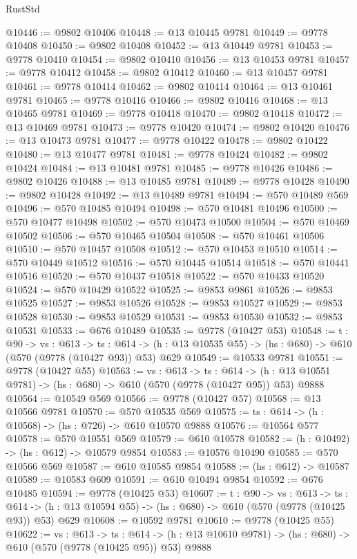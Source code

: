 \begin{lexlean}{RustStd}
\begin{coremodule}
@10446 := @9802 @10406
@10448 := @13 @10445 @9781
@10449 := @9778 @10408
@10450 := @9802 @10408
@10452 := @13 @10449 @9781
@10453 := @9778 @10410
@10454 := @9802 @10410
@10456 := @13 @10453 @9781
@10457 := @9778 @10412
@10458 := @9802 @10412
@10460 := @13 @10457 @9781
@10461 := @9778 @10414
@10462 := @9802 @10414
@10464 := @13 @10461 @9781
@10465 := @9778 @10416
@10466 := @9802 @10416
@10468 := @13 @10465 @9781
@10469 := @9778 @10418
@10470 := @9802 @10418
@10472 := @13 @10469 @9781
@10473 := @9778 @10420
@10474 := @9802 @10420
@10476 := @13 @10473 @9781
@10477 := @9778 @10422
@10478 := @9802 @10422
@10480 := @13 @10477 @9781
@10481 := @9778 @10424
@10482 := @9802 @10424
@10484 := @13 @10481 @9781
@10485 := @9778 @10426
@10486 := @9802 @10426
@10488 := @13 @10485 @9781
@10489 := @9778 @10428
@10490 := @9802 @10428
@10492 := @13 @10489 @9781
@10494 := @570 @10489 @569
@10496 := @570 @10485 @10494
@10498 := @570 @10481 @10496
@10500 := @570 @10477 @10498
@10502 := @570 @10473 @10500
@10504 := @570 @10469 @10502
@10506 := @570 @10465 @10504
@10508 := @570 @10461 @10506
@10510 := @570 @10457 @10508
@10512 := @570 @10453 @10510
@10514 := @570 @10449 @10512
@10516 := @570 @10445 @10514
@10518 := @570 @10441 @10516
@10520 := @570 @10437 @10518
@10522 := @570 @10433 @10520
@10524 := @570 @10429 @10522
@10525 := @9853 @9861
@10526 := @9853 @10525
@10527 := @9853 @10526
@10528 := @9853 @10527
@10529 := @9853 @10528
@10530 := @9853 @10529
@10531 := @9853 @10530
@10532 := @9853 @10531
@10533 := @676 @10489
@10535 := @9778 (@10427 @53)
@10548 := {t : @90} ->
  {vs : @613} ->
  {ts : @614} -> (h : @13 @10535 @55) -> (hs : @680) -> @610 (@570 (@9778 (@10427 @93)) @53) @629
@10549 := @10533 @9781
@10551 := @9778 (@10427 @55)
@10563 := {vs : @613} ->
  {ts : @614} -> (h : @13 @10551 @9781) -> (hs : @680) -> @610 (@570 (@9778 (@10427 @95)) @53) @9888
@10564 := @10549 @569
@10566 := @9778 (@10427 @57)
@10568 := @13 @10566 @9781
@10570 := @570 @10535 @569
@10575 := {ts : @614} -> (h : @10568) -> (hs : @726) -> @610 @10570 @9888
@10576 := @10564 @577
@10578 := @570 @10551 @569
@10579 := @610 @10578
@10582 := (h : @10492) -> (hs : @612) -> @10579 @9854
@10583 := @10576 @10490
@10585 := @570 @10566 @569
@10587 := @610 @10585 @9854
@10588 := (hs : @612) -> @10587
@10589 := @10583 @609
@10591 := @610 @10494 @9854
@10592 := @676 @10485
@10594 := @9778 (@10425 @53)
@10607 := {t : @90} ->
  {vs : @613} ->
  {ts : @614} -> (h : @13 @10594 @55) -> (hs : @680) -> @610 (@570 (@9778 (@10425 @93)) @53) @629
@10608 := @10592 @9781
@10610 := @9778 (@10425 @55)
@10622 := {vs : @613} ->
  {ts : @614} -> (h : @13 @10610 @9781) -> (hs : @680) -> @610 (@570 (@9778 (@10425 @95)) @53) @9888

\end{coremodule}
\end{lexlean}
